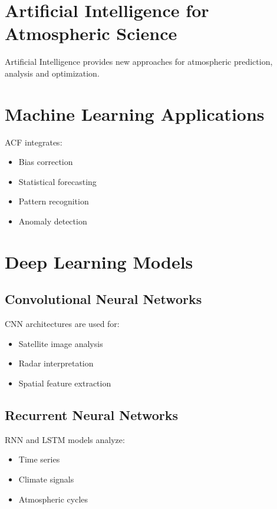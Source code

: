 \section{Artificial Intelligence for Atmospheric Science}

Artificial Intelligence provides new approaches for atmospheric
prediction, analysis and optimization.



\section{Machine Learning Applications}

ACF integrates:

\begin{itemize}
\item Bias correction
\item Statistical forecasting
\item Pattern recognition
\item Anomaly detection
\end{itemize}



\section{Deep Learning Models}


\subsection{Convolutional Neural Networks}

CNN architectures are used for:

\begin{itemize}
\item Satellite image analysis
\item Radar interpretation
\item Spatial feature extraction
\end{itemize}



\subsection{Recurrent Neural Networks}

RNN and LSTM models analyze:

\begin{itemize}
\item Time series
\item Climate signals
\item Atmospheric cycles
\end{itemize}



